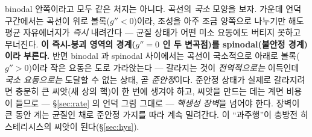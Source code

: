 \documentclass[11pt,a4paper]{article}
\begin{document}
binodal 안쪽이라고 모두 같은 처지는 아니다. 곡선의 \emph{국소} 모양을 보자. 가운데 언덕 구간에서는 곡선이
위로 볼록($g''<0$)이라, 조성을 아주 조금 양쪽으로 나누기만 해도 평균 자유에너지가 \emph{즉시} 내려간다 —
균질 상태가 어떤 미소 요동에도 버티지 못하고 무너진다. \textbf{이 즉시-붕괴 영역의 경계($g''=0$ 인 두
변곡점)를 spinodal(불안정 경계)이라 부른다.} 반면 binodal 과 spinodal 사이에서는 곡선이 국소적으로 아래로
볼록($g''>0$)이라 작은 요동은 도로 가라앉는다 — 갈라지는 것이 \emph{전역적으로는} 이득인데 \emph{국소
요동으로는} 도달할 수 없는 상태, 곧 \emph{준안정}이다. 준안정 상태가 실제로 갈라지려면 충분히 큰 씨앗(새
상의 핵)이 한 번에 생겨야 하고, 씨앗을 만드는 데는 계면 비용이 들므로 — \S\ref{sec:rate} 의 언덕 그림
그대로 — \emph{핵생성 장벽}을 넘어야 한다. 장벽이 큰 동안 계는 균질인 채로 준안정 가지를 따라 계속
밀려간다. 이 ``과주행''이 충방전 히스테리시스의 씨앗이 된다(\S\ref{sec:hys}).
\end{document}

